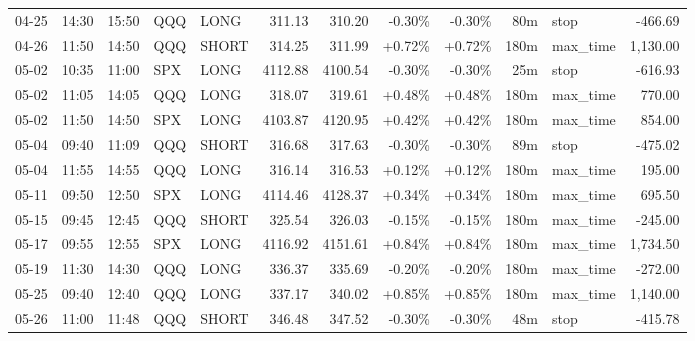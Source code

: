 \documentclass[11pt,a4paper]{article}
\begin{document}
\begin{center}
\begin{longtable}{>{\color{txtmain}}l l l l l r r r r r >{\color{txtmain}}l r}
04-25 & 14:30 & 15:50 & QQQ & LONG & 311.13 & 310.20 & \textcolor{lossred}{-0.30\%} & \textcolor{lossred}{-0.30\%} & 80m & stop & \textcolor{lossred}{-466.69} \\
04-26 & 11:50 & 14:50 & QQQ & SHORT & 314.25 & 311.99 & \textcolor{wingreen}{+0.72\%} & \textcolor{wingreen}{+0.72\%} & 180m & max\_time & \textcolor{wingreen}{1,130.00} \\
05-02 & 10:35 & 11:00 & SPX & LONG & 4112.88 & 4100.54 & \textcolor{lossred}{-0.30\%} & \textcolor{lossred}{-0.30\%} & 25m & stop & \textcolor{lossred}{-616.93} \\
05-02 & 11:05 & 14:05 & QQQ & LONG & 318.07 & 319.61 & \textcolor{wingreen}{+0.48\%} & \textcolor{wingreen}{+0.48\%} & 180m & max\_time & \textcolor{wingreen}{770.00} \\
05-02 & 11:50 & 14:50 & SPX & LONG & 4103.87 & 4120.95 & \textcolor{wingreen}{+0.42\%} & \textcolor{wingreen}{+0.42\%} & 180m & max\_time & \textcolor{wingreen}{854.00} \\
05-04 & 09:40 & 11:09 & QQQ & SHORT & 316.68 & 317.63 & \textcolor{lossred}{-0.30\%} & \textcolor{lossred}{-0.30\%} & 89m & stop & \textcolor{lossred}{-475.02} \\
05-04 & 11:55 & 14:55 & QQQ & LONG & 316.14 & 316.53 & \textcolor{wingreen}{+0.12\%} & \textcolor{wingreen}{+0.12\%} & 180m & max\_time & \textcolor{wingreen}{195.00} \\
05-11 & 09:50 & 12:50 & SPX & LONG & 4114.46 & 4128.37 & \textcolor{wingreen}{+0.34\%} & \textcolor{wingreen}{+0.34\%} & 180m & max\_time & \textcolor{wingreen}{695.50} \\
05-15 & 09:45 & 12:45 & QQQ & SHORT & 325.54 & 326.03 & \textcolor{lossred}{-0.15\%} & \textcolor{lossred}{-0.15\%} & 180m & max\_time & \textcolor{lossred}{-245.00} \\
05-17 & 09:55 & 12:55 & SPX & LONG & 4116.92 & 4151.61 & \textcolor{wingreen}{+0.84\%} & \textcolor{wingreen}{+0.84\%} & 180m & max\_time & \textcolor{wingreen}{1,734.50} \\
05-19 & 11:30 & 14:30 & QQQ & LONG & 336.37 & 335.69 & \textcolor{lossred}{-0.20\%} & \textcolor{lossred}{-0.20\%} & 180m & max\_time & \textcolor{lossred}{-272.00} \\
05-25 & 09:40 & 12:40 & QQQ & LONG & 337.17 & 340.02 & \textcolor{wingreen}{+0.85\%} & \textcolor{wingreen}{+0.85\%} & 180m & max\_time & \textcolor{wingreen}{1,140.00} \\
05-26 & 11:00 & 11:48 & QQQ & SHORT & 346.48 & 347.52 & \textcolor{lossred}{-0.30\%} & \textcolor{lossred}{-0.30\%} & 48m & stop & \textcolor{lossred}{-415.78} \\

\end{longtable}
\end{center}
\end{document}
